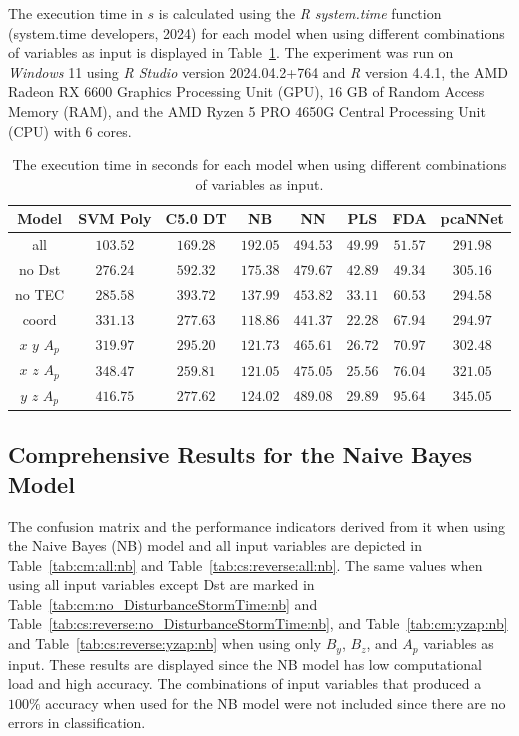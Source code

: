 \documentclass[sn-mathphys-num]{sn-jnl}%
\begin{document}
The execution time in $s$ is calculated using the \textit{R} \textit{system.time} function (system.time developers, 2024) for each model when using different combinations of variables as input is displayed in Table~\ref{tab:time:total}. The experiment was run on \textit{Windows} 11 using \textit{R Studio} version 2024.04.2+764 and \textit{R} version 4.4.1, the AMD Radeon RX 6600 Graphics Processing Unit (GPU), $16$ GB of Random Access Memory (RAM), and the AMD Ryzen 5 PRO 4650G Central Processing Unit (CPU) with $6$ cores.

\begin{table}[!ht]
    \centering
    \caption{The execution time in seconds for each model when using different combinations of variables as input.}
	\label{tab:time:total}
	\begin{tabular}{|c|c|c|c|c|c|c|c|}
		\hline
		Model & SVM Poly & C5.0 DT & NB & NN & PLS & FDA & pcaNNet \\ \hline
		all & $103.52$ & $169.28$ & $192.05$ & $494.53$ & $49.99$ & $51.57$ & $291.98$ \\ \hline
		no Dst & $276.24$ & $592.32$ & $175.38$ & $479.67$ & $42.89$ & $49.34$ & $305.16$ \\ \hline
		no TEC & $285.58$ & $393.72$ & $137.99$ & $453.82$ & $33.11$ & $60.53$ & $294.58$ \\ \hline
		coord & $331.13$ & $277.63$ & $118.86$ & $441.37$ & $22.28$ & $67.94$ & $294.97$ \\ \hline
		$x$ $y$ $A_{p}$ & $319.97$ & $295.20$ & $121.73$ & $465.61$ & $26.72$ & $70.97$ & $302.48$ \\ \hline
		$x$ $z$ $A_{p}$ & $348.47$ & $259.81$ & $121.05$ & $475.05$ & $25.56$ & $76.04$ & $321.05$ \\ \hline
		$y$ $z$ $A_{p}$ & $416.75$ & $277.62$ & $124.02$ & $489.08$ & $29.89$ & $95.64$ & $345.05$ \\ \hline
	\end{tabular}
\end{table}

\subsection{Comprehensive Results for the Naive Bayes Model}

The confusion matrix and the performance indicators derived from it when using the Naive Bayes (NB) model and all input variables are depicted in Table~\ref{tab:cm:all:nb} and Table~\ref{tab:cs:reverse:all:nb}. The same values when using all input variables except Dst are marked in Table~\ref{tab:cm:no_DisturbanceStormTime:nb} and Table~\ref{tab:cs:reverse:no_DisturbanceStormTime:nb}, and Table~\ref{tab:cm:yzap:nb} and Table~\ref{tab:cs:reverse:yzap:nb} when using only $B_{y}$, $B_{z}$, and $A_{p}$ variables as input. These results are displayed since the NB model has low computational load and high accuracy. The combinations of input variables that produced a $100\%$ accuracy when used for the NB model were not included since there are no errors in classification.
\end{document}
